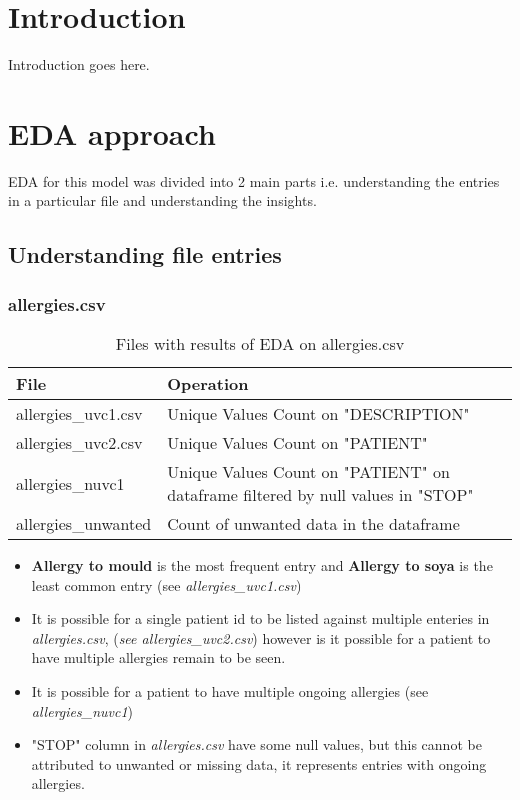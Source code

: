 \documentclass[12pt, twosided]{report}  %
\begin{document}
\pagebreak

\section{Introduction}
Introduction goes here.

\section{EDA approach}
EDA for this model was divided into 2 main parts i.e. understanding the entries in a particular file and understanding the insights.
 
\subsection{Understanding file entries}

\subsubsection{allergies.csv}


\begin{table}[H]
	\begin{tabular}{l|l}
		\textbf{File}                & \textbf{Operation} \\ \hline
		allergies\_uvc1.csv & Unique Values Count on "DESCRIPTION"   \\
		allergies\_uvc2.csv & Unique Values Count on "PATIENT"  \\
		allergies\_nuvc1    & Unique Values Count on "PATIENT" on dataframe filtered by null   values in "STOP"   \\
		allergies\_unwanted & Count of unwanted data in the dataframe  \\
	\end{tabular}
	\caption{Files with results of EDA on allergies.csv}
\end{table}

\begin{itemize}
	\item \textbf{Allergy to mould} is the most frequent entry and \textbf{Allergy to soya} is the least common entry (see \textit{allergies\_uvc1.csv})
	
	\item It is possible for a single patient id to be listed against multiple enteries in \textit{allergies.csv}, (\textit{see allergies\_uvc2.csv}) however is it possible for a patient to have multiple allergies remain to be seen.
	
	\item It is possible for a patient to have multiple ongoing allergies (see \textit{allergies\_nuvc1})
	
	\item "STOP" column in \textit{allergies.csv} have some null values, but this cannot be attributed to unwanted or missing data, it represents entries with ongoing allergies.
	
\end{itemize}
\end{document}
